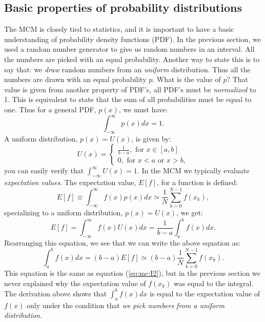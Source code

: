 \documentclass[graybox,sectrefs,envcountresetchap,open=right,final]{svmonodo}
\begin{document}
\subsection{Basic properties of probability distributions}
The MCM is closely tied to statistics, and it is important to have a
basic understanding of probability density functions (PDF). In
the previous section, we used a random number generator to give us
random numbers in an interval. All the numbers are picked with an
equal probability. Another way to state this is to say that: we \emph{draw}
random numbers from an \emph{uniform} distribution. Thus all the numbers
are drawn with an equal probability $p$. What is the value of $p$?
That value is given from another property of PDF's, all PDF's must
be \emph{normalized} to 1. This is equivalent to state that the sum of all
probabilities must be equal to one. Thus for a general PDF, $p(x)$, we
must have:
\begin{equation}
\int_{-\infty}^{\infty}p(x)dx=1.
\label{eq:mc:pdf1}
\end{equation}
A uniform distribution, $p(x)=U(x)$, is given by:
\begin{equation}
U(x)=\begin{cases} \frac{1}{b-a}, \text{ for }x\in[a,b]\\ 
0, \text{ for } x<a \text{ or }x>b,
\end{cases}
\label{eq:mc:pdfu}
\end{equation}
you can easily verify that $\int_{-\infty}^{\infty}U(x)=1$. In the MCM
we typically evaluate \emph{expectation values}. The expectation
value, $E[f]$, for a function is defined:
\begin{equation}
E[f]\equiv\int_{-\infty}^{\infty}f(x)p(x)dx\simeq\frac{1}{N}\sum_{k=0}^{N-1}f(x_k),
\label{eq:mc:ef}
\end{equation}
specializing to a uniform distribution, $p(x)=U(x)$, we get:
\begin{equation}
E[f]=\int_{-\infty}^{\infty}f(x)U(x)dx=\frac{1}{b-a}\int_a^bf(x)dx.
\label{eq:mc:efu}
\end{equation}
Rearranging this equation, we see that we can write the above equation
as:
\begin{equation}
\int_a^bf(x)dx=(b-a)E[f]\simeq(b-a)\frac{1}{N}\sum_{k=0}^{N-1}f(x_k).
\label{eq:mc:efu2}
\end{equation}
This equation is the same as equation (\ref{eq:mc:I2}), but in the
previous section we never explained why the expectation value of
$f(x_k)$ was equal to the integral. The derivation above shows that
$\int_a^bf(x)dx$ is equal to the expectation value of $f(x)$ 
only under the condition that \emph{we pick numbers from a uniform distribution}.
\end{document}
